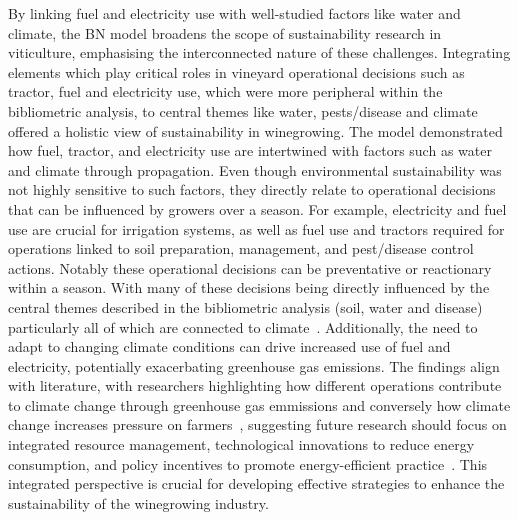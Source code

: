 By linking fuel and electricity use with well-studied factors like water and climate, the BN model broadens the scope of sustainability research in viticulture, emphasising the interconnected nature of these challenges. Integrating elements which play critical roles in vineyard operational decisions such as tractor, fuel and electricity use, which were more peripheral within the bibliometric analysis, to central themes like water, pests/disease and climate offered a holistic view of sustainability in winegrowing. The model demonstrated how fuel, tractor, and electricity use are intertwined with factors such as water and climate through propagation. Even though environmental sustainability was not highly sensitive to such factors, they directly relate to operational decisions that can be influenced by growers over a season. For example, electricity and fuel use are crucial for irrigation systems, as well as fuel use and tractors required for operations linked to soil preparation, management, and pest/disease control actions. Notably these operational decisions can be preventative or reactionary within a season. With many of these decisions being directly influenced by the central themes described in the bibliometric analysis (soil, water and disease) particularly all of which are connected to climate~\cite{fragaClimateChangeNew2020,tofaloClimateChangeWine2023,naigeonDATADecisionmakingViticulture2023}. Additionally, the need to adapt to changing climate conditions can drive increased use of fuel and electricity, potentially exacerbating greenhouse gas emissions. The findings align with literature, with researchers highlighting how different operations contribute to climate change through greenhouse gas emmissions \cite{pilafidisAssessingEnergyUse2023,cechPesticideUseAssociated2022,zhangEstimatingEconomicEnvironmental2019} and conversely how climate change increases pressure on farmers~\cite{barnaEditorialImprovingSustainability2023,costaRoleSoilTemperature2023,atakClimateChangeAdaptive2024}, suggesting future research should focus on integrated resource management, technological innovations to reduce energy consumption, and policy incentives to promote energy-efficient practice~\cite{pereiraViticultureClimateChange2023}. This integrated perspective is crucial for developing effective strategies to enhance the sustainability of the winegrowing industry.

